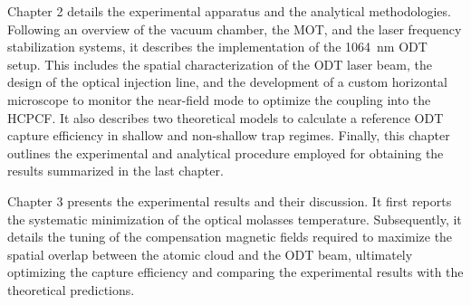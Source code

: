 \documentclass[../../thesis_main.tex]{subfiles}
\begin{document}
    Chapter 2 details the experimental apparatus and the analytical methodologies. Following an overview of the vacuum chamber, the MOT, and the laser frequency stabilization systems, it describes the implementation of the 1064~nm ODT setup. This includes the spatial characterization of the ODT laser beam, the design of the optical injection line, and the development of a custom horizontal microscope to monitor the near-field mode to optimize the coupling into the HCPCF. It also describes two theoretical models to calculate a reference ODT capture efficiency in shallow and non-shallow trap regimes. Finally, this chapter outlines the experimental and analytical procedure employed for obtaining the results summarized in the last chapter.

    Chapter 3 presents the experimental results and their discussion. It first reports the systematic minimization of the optical molasses temperature. Subsequently, it details the tuning of the compensation magnetic fields required to maximize the spatial overlap between the atomic cloud and the ODT beam, ultimately optimizing the capture efficiency and comparing the experimental results with the theoretical predictions.
\end{document}
